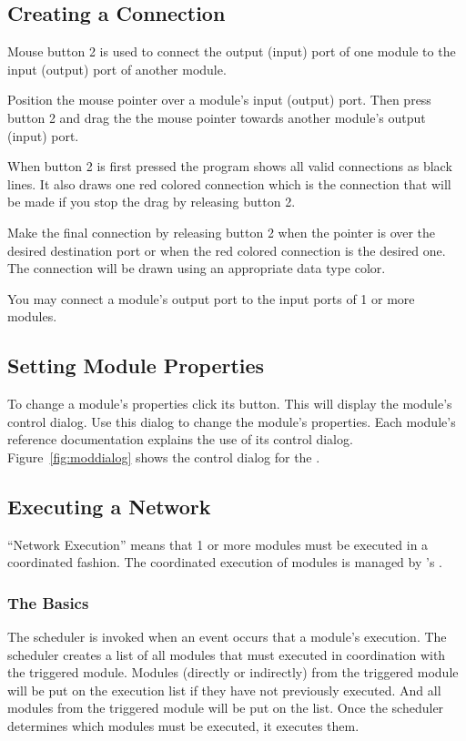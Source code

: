 \subsection{Creating a Connection}
\label{sec:connectmods}

Mouse button 2 is used to connect the output (input) port of one module to the
input (output) port of another module.  

Position the mouse pointer over a module's input (output) port.  Then press
button 2 and drag the the mouse pointer towards another module's output (input)
port.   

When button 2 is first pressed the program shows all valid connections as
black lines.  It also draws one red colored connection which is the
connection that will be made if you stop the drag by releasing 
button 2.

Make the final connection by releasing button 2 when the pointer is over
the desired destination port or when the red colored connection is the
desired one.  The connection will be drawn using an appropriate data type
color.

You may connect a module's output port to the input ports of 1 or more
modules.

\subsection{Setting Module Properties}
\label{sec:setmodprops}

To change a module's properties click its  button.  This will
display the module's control dialog.  Use this dialog to change the
module's properties.  Each module's reference documentation explains the
use of its control dialog.  Figure~\ref{fig:moddialog} shows the control
dialog for the .

\subsection{Executing a Network}
\label{sec:executenet}

``Network Execution'' means that 1 or more modules must be executed in a
coordinated fashion. The coordinated execution of modules is managed by
\sr{}'s .

\subsubsection{The Basics}

The scheduler is invoked when an event occurs that  a
module's execution.  The scheduler creates a list of all modules that must
executed in coordination with the triggered module. Modules
 (directly or indirectly) from the triggered module will be
put on the execution list if they have not previously executed.  And all
modules  from the triggered module will be put on the
list.  Once the scheduler determines which modules must be executed, it
executes them.

